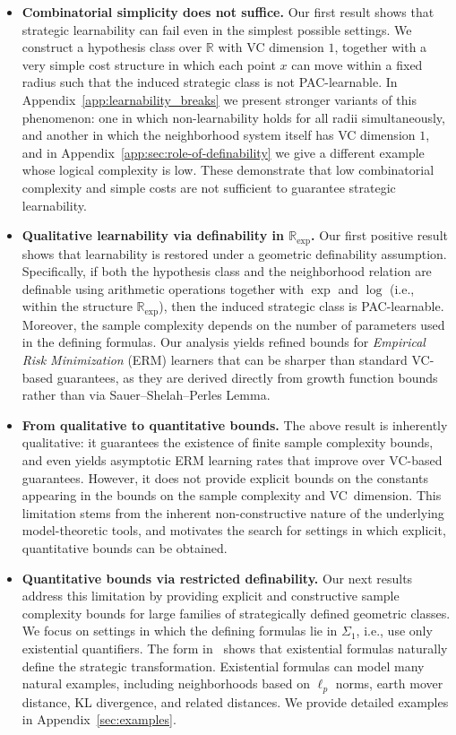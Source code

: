 \documentclass[11pt]{article}
\theoremstyle{plain}
\theoremstyle{definition}
\theoremstyle{remark}
\begin{document}
\begin{itemize}[leftmargin=1em,topsep=0em,itemsep=0.2em]

\item \textbf{Combinatorial simplicity does not suffice.}
Our first result shows that strategic learnability can fail even in the simplest possible settings.
We construct a hypothesis class over $\mathbb{R}$ with VC dimension $1$,
together with a very simple cost structure in which each point $x$ can move within a fixed radius such that the induced strategic class is not PAC-learnable.
In Appendix~\ref{app:learnability_breaks} we present stronger variants of this phenomenon: one in which non-learnability holds for all radii simultaneously, and another in which the neighborhood system itself has VC dimension $1$, and in Appendix~\ref{app:sec:role-of-definability} we give a different example whose logical complexity is low. These demonstrate that low combinatorial complexity and simple costs
are not sufficient to guarantee strategic learnability.

\item \textbf{Qualitative learnability via definability in $\mathbb{R}_{\exp}$.}
Our first positive result shows that learnability is restored under a geometric definability assumption.
Specifically, if both the hypothesis class and the neighborhood relation
are definable using arithmetic operations together with $\exp$ and $\log$
(i.e., within the structure $\mathbb{R}_{\exp}$),
then the induced strategic class is PAC-learnable.
Moreover, the sample complexity depends on the number of parameters
used in the defining formulas.
Our analysis yields refined bounds for \emph{Empirical Risk Minimization} (ERM) learners
that can be sharper than standard VC-based guarantees,
as they are derived directly from growth function bounds
rather than via Sauer--Shelah--Perles Lemma.

\item \textbf{From qualitative to quantitative bounds.}
The above result is inherently qualitative:
it guarantees the existence of finite sample complexity bounds,
and even yields asymptotic ERM learning rates that improve over VC-based guarantees.
However, it does not provide explicit bounds on the constants appearing in the bounds on the sample complexity and VC~dimension.
This limitation stems from the inherent non-constructive nature of the underlying model-theoretic tools,
and motivates the search for settings in which explicit, quantitative bounds can be obtained.

\item \textbf{Quantitative bounds via restricted definability.}
Our next results address this limitation by providing explicit and constructive sample complexity bounds
for large families of strategically defined geometric classes.
We focus on settings in which the defining formulas lie in $\Sigma_1$,
i.e., use only existential quantifiers.
The form in~ shows that existential formulas naturally define
the strategic transformation.
Existential formulas can model many natural examples,
including neighborhoods based on $\ell_p$ norms, earth mover distance, KL divergence, and related distances.
We provide detailed examples in Appendix~\ref{sec:examples}.


\end{itemize}
\end{document}
